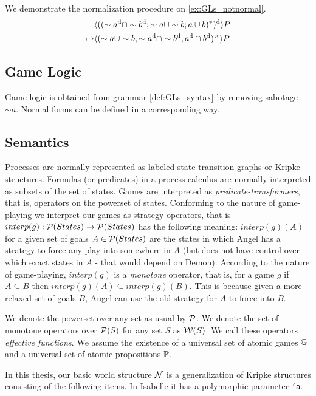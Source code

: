 We demonstrate the normalization procedure on \autoref{ex:GLs_notnormal}.
\begin{align*}
        & \langle((\sim a^\text{d} \cap \sim b^\text{d} ; \sim a\cup \sim b; a\cup b)^*)^\text{d}\rangle P \\
    \mapsto & \langle(\sim a \cup \sim b ; \sim a^\text{d}\cap \sim b^\text{d}; a^\text{d}\cap b^\text{d})^\times\rangle P
\end{align*}

\subsection{Game Logic}
Game logic \GL{} is obtained from \GLs{} grammar \autoref{def:GLs_syntax} by removing sabotage $\sim a$. Normal forms can be defined in a corresponding way. 

\subsection{Semantics}
\label{subsec:GLs_sem}
Processes are normally represented as labeled state transition graphs or Kripke structures. Formulas (or predicates) in a process calculus are normally interpreted as subsets of the set of states. Games are interpreted as \textit{predicate-transformers}, that is, operators on the powerset of states. Conforming to the nature of game-playing we interpret our games as strategy operators, that is $interp(g): \mathcal{P}(States) \rightarrow \mathcal{P} (States)$ has the following meaning: $interp(g)(A)$ for a given set of goals $A\in \mathcal{P} (States)$ are the states in which Angel has a strategy to force any play into somewhere in $A$ (but does not have control over which exact states in $A$ - that would depend on Demon). According to the nature of game-playing, $interp(g)$ is a  \textit{monotone} operator, that is, for a game $g$ if $A\subseteq B$ then $interp(g)(A)\subseteq interp(g)(B)$. This is because given a more relaxed set of goals $B$, Angel can use the old strategy for $A$ to force into $B$. 

We denote the powerset over any set as usual by $\mathcal{P}$. We denote the set of monotone operators over $\mathcal{P}(S)$ for any set $S$ as $\mathcal{W}(S)$. We call these operators \textit{effective functions}. We assume the existence of a universal set of atomic games $\mathbb{G}$ and a universal set of atomic propositions $\mathbb{P}$.

In this thesis, our basic world structure $\mathcal{N}$ is a generalization of Kripke structures consisting of the following items. In Isabelle it has a polymorphic parameter \texttt{'a}.

